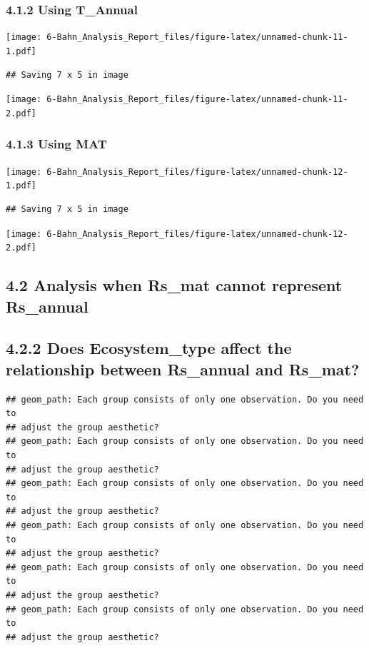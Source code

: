 \documentclass[]{article}
\begin{document}
\hypertarget{using-t_annual}{%
\subsubsection{4.1.2 Using T\_Annual}\label{using-t_annual}}

\texttt{[image: 6-Bahn\_Analysis\_Report\_files/figure-latex/unnamed-chunk-11-1.pdf]}

\begin{verbatim}
## Saving 7 x 5 in image
\end{verbatim}

\texttt{[image: 6-Bahn\_Analysis\_Report\_files/figure-latex/unnamed-chunk-11-2.pdf]}

\hypertarget{using-mat}{%
\subsubsection{4.1.3 Using MAT}\label{using-mat}}

\texttt{[image: 6-Bahn\_Analysis\_Report\_files/figure-latex/unnamed-chunk-12-1.pdf]}

\begin{verbatim}
## Saving 7 x 5 in image
\end{verbatim}

\texttt{[image: 6-Bahn\_Analysis\_Report\_files/figure-latex/unnamed-chunk-12-2.pdf]}

\hypertarget{analysis-when-rs_mat-cannot-represent-rs_annual}{%
\subsection{4.2 Analysis when Rs\_mat cannot represent
Rs\_annual}\label{analysis-when-rs_mat-cannot-represent-rs_annual}}

\hypertarget{does-ecosystem_type-affect-the-relationship-between-rs_annual-and-rs_mat}{%
\subsection{4.2.2 Does Ecosystem\_type affect the relationship between
Rs\_annual and
Rs\_mat?}\label{does-ecosystem_type-affect-the-relationship-between-rs_annual-and-rs_mat}}

\begin{verbatim}
## geom_path: Each group consists of only one observation. Do you need to
## adjust the group aesthetic?
## geom_path: Each group consists of only one observation. Do you need to
## adjust the group aesthetic?
## geom_path: Each group consists of only one observation. Do you need to
## adjust the group aesthetic?
## geom_path: Each group consists of only one observation. Do you need to
## adjust the group aesthetic?
## geom_path: Each group consists of only one observation. Do you need to
## adjust the group aesthetic?
## geom_path: Each group consists of only one observation. Do you need to
## adjust the group aesthetic?
\end{verbatim}
\end{document}
